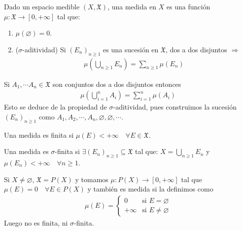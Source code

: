 \begin{definition}[Medida]
    Dado un espacio medible $(X, \mathfrak{X})$, una medida en $X$ es una función $\mu : \mathfrak{X} \to [0, +\infty]$ tal que:
    \begin{enumerate}
        \item $\mu(\varnothing) = 0$.
        \item ($\sigma$-aditividad) Si $(E_n)_{n \geq 1}$ es una sucesión en $\mathfrak{X}$, dos a dos disjuntos $\Rightarrow$ \begin{align*}
                  \mu(\bigcup_{n \geq 1} E_n) = \sum_{n \geq 1} \mu(E_n)
              \end{align*}
    \end{enumerate}
\end{definition}

\begin{note}
    Si $A_1, \cdots A_n \in \mathfrak{X}$ son conjuntos dos a dos disjuntos entonces \begin{align*}
        \mu(\bigcup_{i = 1}^n A_i) = \sum_{i = 1}^n \mu(A_i)
    \end{align*}
    Esto se deduce de la propiedad de $\sigma$-aditividad, pues construimos la sucesión $(E_n)_{n \geq 1}$ como $A_1, A_2, \cdots, A_n, \varnothing, \varnothing, \cdots$.
\end{note}

\begin{definition}
    Una medida es finita si $\mu(E) < +\infty \quad \forall E \in \mathfrak{X}$.
\end{definition}

\begin{definition}
    Una medida es $\sigma$-finita si $\exists (E_n)_{n \geq 1} \subseteq \mathfrak{X}$ tal que: $X = \bigcup_{n \geq 1} E_n$ y $\mu(E_n) < +\infty \quad \forall n \geq 1$.
\end{definition}

\begin{eg}
    Si $X \neq \varnothing$, $\mathfrak{X} = P(X)$ y tomamos $\mu : P(X) \to [0, +\infty]$ tal que $\mu(E) = 0 \quad \forall E \in P(X)$ y también es medida si la definimos como \begin{align*}
        \mu(E) = \begin{cases}
                     0       & \text{si } E = \varnothing    \\
                     +\infty & \text{si } E \neq \varnothing
                 \end{cases}
    \end{align*}
    Luego no es finita, ni $\sigma$-finita.
\end{eg}

